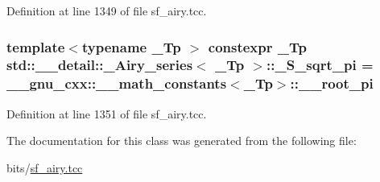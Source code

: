 Definition at line 1349 of file sf\+\_\+airy.\+tcc.

\subsubsection[{\texorpdfstring{\+\_\+\+S\+\_\+sqrt\+\_\+pi}{_S_sqrt_pi}}]{\setlength{\rightskip}{0pt plus 5cm}template$<$typename \+\_\+\+Tp $>$ constexpr \+\_\+\+Tp {\bf std\+::\+\_\+\+\_\+detail\+::\+\_\+\+Airy\+\_\+series}$<$ \+\_\+\+Tp $>$\+::\+\_\+\+S\+\_\+sqrt\+\_\+pi = \+\_\+\+\_\+gnu\+\_\+cxx\+::\+\_\+\+\_\+math\+\_\+constants$<$\+\_\+\+Tp$>$\+::\+\_\+\+\_\+root\+\_\+pi\hspace{0.3cm}{\ttfamily [static]}}\hypertarget{classstd_1_1____detail_1_1__Airy__series_a3fd1fba37ef8beb0d89854d4e58b8a38}{}\label{classstd_1_1____detail_1_1__Airy__series_a3fd1fba37ef8beb0d89854d4e58b8a38}


Definition at line 1351 of file sf\+\_\+airy.\+tcc.



The documentation for this class was generated from the following file\+:\begin{DoxyCompactItemize}
\item 
bits/\hyperlink{sf__airy_8tcc}{sf\+\_\+airy.\+tcc}\end{DoxyCompactItemize}
